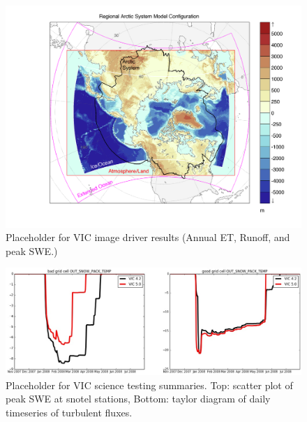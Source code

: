 \documentclass[gmd, manuscript]{copernicus}
\begin{document}
\clearpage
\begin{figure}[t]
\includegraphics[width=12cm]{RASM_Domain.png}
\caption{Placeholder for VIC image driver results (Annual ET, Runoff, and peak SWE.)}
\label{fig:vic_domain_results}
\end{figure}

\clearpage
\begin{figure}[t]
\includegraphics[width=12cm]{VIC_4v5.jpg}
\caption{Placeholder for VIC science testing summaries. Top: scatter plot of peak SWE at snotel stations, Bottom: taylor diagram of daily timeseries of turbulent fluxes.}
\label{fig:vic_4v5}
\end{figure}
\end{document}
